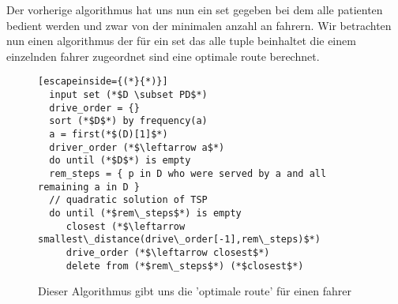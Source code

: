 \documentclass[a4]{article}
\begin{document}
Der vorherige algorithmus hat uns nun ein set gegeben bei dem alle patienten bedient werden und zwar von der minimalen anzahl an fahrern. Wir betrachten nun einen algorithmus der für ein set das alle tuple beinhaltet die einem einzelnden fahrer zugeordnet sind eine optimale route berechnet.

\begin{figure}[h]
\begin{lstlisting}[escapeinside={(*}{*)}]
  input set (*$D \subset PD$*)
  drive_order = {}
  sort (*$D$*) by frequency(a)
  a = first(*$(D)[1]$*)
  driver_order (*$\leftarrow a$*)
  do until (*$D$*) is empty
  rem_steps = { p in D who were served by a and all remaining a in D }
  // quadratic solution of TSP
  do until (*$rem\_steps$*) is empty
     closest (*$\leftarrow smallest\_distance(drive\_order[-1],rem\_steps)$*)
     drive_order (*$\leftarrow closest$*)
     delete from (*$rem\_steps$*) (*$closest$*)
\end{lstlisting}
\caption{Dieser Algorithmus gibt uns die 'optimale route' für einen fahrer}
\end{figure}
\end{document}
